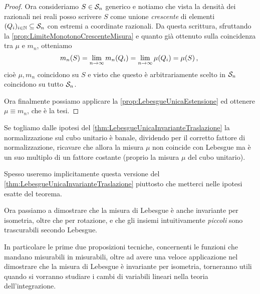 \begin{proof}
	Ora consideriamo $S\in\S_n$ generico e notiamo che vista la densità dei razionali nei reali posso scrivere $S$ come unione \emph{crescente} di elementi $(Q_i)_{i\in\N}\subseteq \S_n$ con estremi a coordinate razionali. 
	Da questa scrittura, sfruttando la \cref{prop:LimiteMonotonoCrescenteMisura} e quanto già ottenuto sulla coincidenza tra $\mu$ e $m_n$, otteniamo
	\begin{equation*}
		m_n(S)=\lim_{n\to\infty}m_n(Q_i)=\lim_{n\to\infty}\mu(Q_i)=\mu(S) \virgola
	\end{equation*}
	cioè $\mu,m_n$ coincidono su $S$ e visto che questo è arbitrariamente scelto in $\S_n$ coincidono su tutto $\S_n$.
	
	Ora finalmente possiamo applicare la \cref{prop:LebesgueUnicaEstensione} ed ottenere $\mu\equiv m_n$, che è la tesi.
\end{proof}
\begin{remark}
	Se togliamo dalle ipotesi del \cref{thm:LebesgueUnicaInvarianteTraslazione} la normalizzazione sul cubo unitario è banale, dividendo per il corretto fattore di normalizzazione, ricavare che allora la misura $\mu$ non coincide con Lebesgue ma è un suo multiplo di un fattore costante (proprio la misura $\mu$ del cubo unitario).
	
	Spesso useremo implicitamente questa versione del \cref{thm:LebesgueUnicaInvarianteTraslazione} piuttosto che metterci nelle ipotesi esatte del teorema.
\end{remark}



Ora passiamo a dimostrare che la misura di Lebesgue è anche invariante per isometria, oltre che per rotazione, e che gli insiemi intuitivamente \emph{piccoli} sono trascurabili secondo Lebesgue.

In particolare le prime due proposizioni tecniche, concernenti le funzioni che mandano misurabili in misurabili, oltre ad avere una veloce applicazione nel dimostrare che la misura di Lebesgue è invariante per isometria, torneranno utili quando si vorranno studiare i cambi di variabili lineari nella teoria dell'integrazione.

